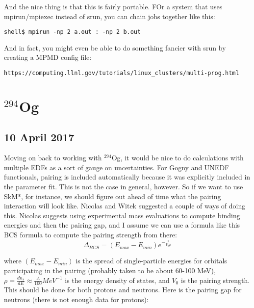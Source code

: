 \documentclass[]{report}
\begin{document}
And the nice thing is that this is fairly portable. FOr a system that uses mpirun/mpiexec instead of srun, you can chain jobs together like this:

\begin{verbatim}
shell$ mpirun -np 2 a.out : -np 2 b.out
\end{verbatim}

And in fact, you might even be able to do something fancier with srun by creating a MPMD config file:

\noindent\verb|https://computing.llnl.gov/tutorials/linux_clusters/multi-prog.html|

\section*{$^{294}$Og}
\subsection*{10 April 2017}
Moving on back to working with $^{294}$Og, it would be nice to do calculations with multiple EDFs as a sort of gauge on uncertainties. For Gogny and UNEDF functionals, pairing is included automatically because it was explicitly included in the parameter fit. This is not the case in general, however. So if we want to use SkM*, for instance, we should figure out ahead of time what the pairing interaction will look like. Nicolas and Witek suggested a couple of ways of doing this. Nicolas suggests using experimental mass evaluations to compute binding energies and then the pairing gap, and I assume we can use a formula like this BCS formula to compute the pairing strength from there:
\begin{equation}
\Delta_{BCS} = (E_{max}-E_{min})e^{-\frac{1}{V_0\rho}}
\end{equation}

\noindent where $(E_{max}-E_{min})$ is the spread of single-particle energies for orbitals participating in the pairing (probably taken to be about 60-100 MeV), $\rho = \frac{dn_s}{dE} \approx \frac{A}{100} MeV^{-1}$ is the energy density of states, and $V_0$ is the pairing strength. This should be done for both protons and neutrons. Here is the pairing gap for neutrons (there is not enough data for protons):
\end{document}
